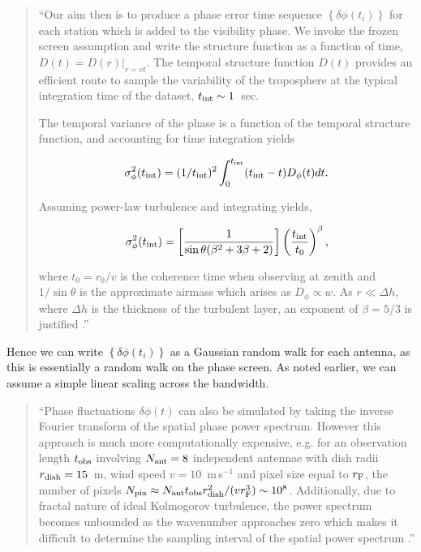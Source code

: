 \begin{quotation}
``Our aim then is to produce a phase error time sequence $\left\{\delta \phi(t_i)\right\}$ for each station which is added to the visibility phase. We invoke the frozen screen assumption and write the structure function as a function of time, ${D (t) =  D(r)|_{r=vt}}$. The temporal structure function $D(t)$ provides an efficient route to sample the variability of the troposphere at the typical integration time of the dataset, $t_{\rm int} \sim 1$~sec. 

The temporal variance of the phase is a function of the temporal structure function, and accounting for time integration yields \citep*[see][B3]{Treuhaft_1987} 

\begin{equation}
\sigma^2_{\phi}(t_{\rm int}) = (1/t_{\rm int})^2 \int_{0}^{t_{\rm int}} (t_{\rm int}-t) D_{\phi}(t) dt.
\end{equation}

Assuming power-law turbulence and integrating yields, 

\begin{equation}\label{eq:turb_final}
\sigma^2_\phi (t_{\rm int})=\left[\frac{1}{\sin\theta(\beta^2 +3\beta +2)}\right]\left(\frac{t_{\rm int}}{t_0}\right)^{\beta},
\end{equation}


\noindent where $t_0 = r_0/v$ is the coherence time when observing at zenith and $1/\sin\theta$ is the approximate airmass which arises as $D_\phi \propto w$. As $r \ll \Delta h$, where $\Delta h$ is the thickness of the turbulent layer, an exponent of $\beta = 5/3$ is justified \citep*{Treuhaft_1987}.''\\
\citep{Blecher_2016}
\end{quotation}


Hence we can write $\left\{\delta \phi(t_i)\right\}$ as a Gaussian random walk for each antenna, as this is essentially a random walk on the phase screen. As noted earlier, we can assume a simple linear scaling across the bandwidth.

\begin{quotation}
``Phase fluctuations $\delta\phi(t)$ can also be simulated by taking the inverse Fourier transform of the spatial phase power spectrum. However this approach is much more computationally expensive, e.g. for an observation length $t_{\rm obs}$ involving $N_{\rm ant}=8$ independent antennae with dish radii $r_{\rm dish}=15$~m, wind speed $v=10$~m\,s$^{-1}$ and pixel size equal to $r_{\rm F}$, the number of pixels $N_{\rm pix} \approx N_{\rm ant} t_{\rm obs} r_{\rm dish}^2/(v r_{\rm F}^3)  \sim 10^8$. Additionally, due to fractal nature of ideal Kolmogorov turbulence, the power spectrum becomes unbounded as the wavenumber approaches zero which makes it difficult to determine the sampling interval of the spatial power spectrum \citep{Lane_1992}.''\\
\citep{Blecher_2016}
\end{quotation}

